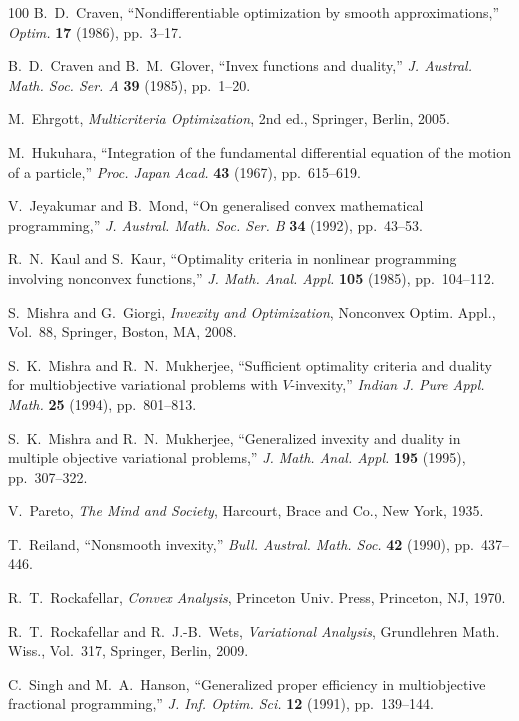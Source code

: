 \documentclass{article}
\theoremstyle{definition}
\begin{document}
\begin{thebibliography}{100}
B.~D.~Craven,
``Nondifferentiable optimization by smooth approximations,''
\emph{Optim.} \textbf{17} (1986), pp.~3--17.

B.~D.~Craven and B.~M.~Glover,
``Invex functions and duality,''
\emph{J. Austral. Math. Soc. Ser. A} \textbf{39} (1985), pp.~1--20.

M.~Ehrgott,
\emph{Multicriteria Optimization},
2nd ed., Springer, Berlin, 2005.

M.~Hukuhara,
``Integration of the fundamental differential equation of the motion of a particle,''
\emph{Proc. Japan Acad.} \textbf{43} (1967), pp.~615--619.

V.~Jeyakumar and B.~Mond,
``On generalised convex mathematical programming,''
\emph{J. Austral. Math. Soc. Ser. B} \textbf{34} (1992), pp.~43--53.

R.~N.~Kaul and S.~Kaur,
``Optimality criteria in nonlinear programming involving nonconvex functions,''
\emph{J. Math. Anal. Appl.} \textbf{105} (1985), pp.~104--112.

S.~Mishra and G.~Giorgi,
\emph{Invexity and Optimization},
Nonconvex Optim. Appl., Vol.~88, Springer, Boston, MA, 2008.

S.~K.~Mishra and R.~N.~Mukherjee,
``Sufficient optimality criteria and duality for multiobjective variational problems with $V$-invexity,''
\emph{Indian J. Pure Appl. Math.} \textbf{25} (1994), pp.~801--813.

S.~K.~Mishra and R.~N.~Mukherjee,
``Generalized invexity and duality in multiple objective variational problems,''
\emph{J. Math. Anal. Appl.} \textbf{195} (1995), pp.~307--322.

V.~Pareto,
\emph{The Mind and Society},
Harcourt, Brace and Co., New York, 1935.

T.~Reiland,
``Nonsmooth invexity,''
\emph{Bull. Austral. Math. Soc.} \textbf{42} (1990), pp.~437--446.

R.~T.~Rockafellar,
\emph{Convex Analysis},
Princeton Univ. Press, Princeton, NJ, 1970.

R.~T.~Rockafellar and R.~J.-B.~Wets,
\emph{Variational Analysis},
Grundlehren Math. Wiss., Vol.~317, Springer, Berlin, 2009.

C.~Singh and M.~A.~Hanson,
``Generalized proper efficiency in multiobjective fractional programming,''
\emph{J. Inf. Optim. Sci.} \textbf{12} (1991), pp.~139--144.


\end{thebibliography}
\end{document}
